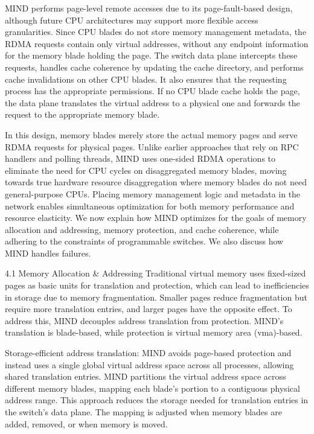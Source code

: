 MIND performs page-level remote accesses due to its page-fault-based design, although future CPU architectures may support more flexible access granularities. Since CPU blades do not store memory management metadata, the RDMA requests contain only virtual addresses, without any endpoint information for the memory blade holding the page. The switch data plane intercepts these requests, handles cache coherence by updating the cache directory, and performs cache invalidations on other CPU blades. It also ensures that the requesting process has the appropriate permissions. If no CPU blade cache holds the page, the data plane translates the virtual address to a physical one and forwards the request to the appropriate memory blade.

In this design, memory blades merely store the actual memory pages and serve RDMA requests for physical pages. Unlike earlier approaches that rely on RPC handlers and polling threads, MIND uses one-sided RDMA operations to eliminate the need for CPU cycles on disaggregated memory blades, moving towards true hardware resource disaggregation where memory blades do not need general-purpose CPUs.
Placing memory management logic and metadata in the network enables simultaneous optimization for both memory performance and resource elasticity. We now explain how MIND optimizes for the goals of memory allocation and addressing, memory protection, and cache coherence, while adhering to the constraints of programmable switches. We also discuss how MIND handles failures.

4.1 Memory Allocation \& Addressing
Traditional virtual memory uses fixed-sized pages as basic units for translation and protection, which can lead to inefficiencies in storage due to memory fragmentation. Smaller pages reduce fragmentation but require more translation entries, and larger pages have the opposite effect. To address this, MIND decouples address translation from protection. MIND's translation is blade-based, while protection is virtual memory area (vma)-based.

Storage-efficient address translation: MIND avoids page-based protection and instead uses a single global virtual address space across all processes, allowing shared translation entries. MIND partitions the virtual address space across different memory blades, mapping each blade’s portion to a contiguous physical address range. This approach reduces the storage needed for translation entries in the switch's data plane. The mapping is adjusted when memory blades are added, removed, or when memory is moved.

